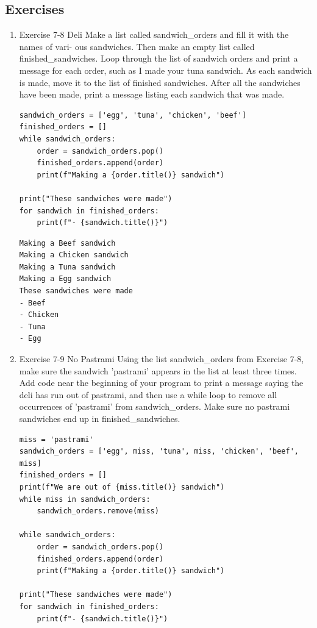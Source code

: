 \documentclass[10pt]{book}
\begin{document}
\subsection{Exercises}
\label{sec:orgd77a139}
\begin{enumerate}
\item Exercise 7-8 Deli
\label{sec:orgd0dbfd2}
Make a list called sandwich\_orders and fill it with the names of vari- ous sandwiches. Then make an empty list called finished\_sandwiches. Loop through the list of sandwich orders and print a message for each order, such as I made your tuna sandwich. As each sandwich is made, move it to the list of finished sandwiches. After all the sandwiches have been made, print a message listing each sandwich that was made.
\begin{verbatim}
sandwich_orders = ['egg', 'tuna', 'chicken', 'beef']
finished_orders = []
while sandwich_orders:
    order = sandwich_orders.pop()
    finished_orders.append(order)
    print(f"Making a {order.title()} sandwich")

print("These sandwiches were made")
for sandwich in finished_orders:
    print(f"- {sandwich.title()}")
\end{verbatim}

\label{orgb417b61}
\begin{verbatim}
Making a Beef sandwich
Making a Chicken sandwich
Making a Tuna sandwich
Making a Egg sandwich
These sandwiches were made
- Beef
- Chicken
- Tuna
- Egg
\end{verbatim}
\item Exercise 7-9 No Pastrami
\label{sec:org430fc37}
Using the list sandwich\_orders from Exercise 7-8, make sure the sandwich 'pastrami' appears in the list at least three times. Add code near the beginning of your program to print a message saying the deli has run out of pastrami, and then use a while loop to remove all occurrences of 'pastrami' from sandwich\_orders. Make sure no pastrami sandwiches end up in finished\_sandwiches.
\begin{verbatim}
miss = 'pastrami'
sandwich_orders = ['egg', miss, 'tuna', miss, 'chicken', 'beef', miss]
finished_orders = []
print(f"We are out of {miss.title()} sandwich")
while miss in sandwich_orders:
    sandwich_orders.remove(miss)

while sandwich_orders:
    order = sandwich_orders.pop()
    finished_orders.append(order)
    print(f"Making a {order.title()} sandwich")

print("These sandwiches were made")
for sandwich in finished_orders:
    print(f"- {sandwich.title()}")
\end{verbatim}


\end{enumerate}
\end{document}
